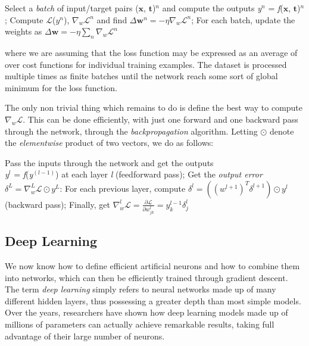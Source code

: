 \begin{outline}[enumerate]
    \1 Select a \emph{batch} of input/target pairs ($\mathbf{x}$, $\mathbf{t}$)$^n$ and compute the outputs \emph{y}$^n$ = \emph{f}($\mathbf{x}$, $\mathbf{t}$)$^n$;
    \1 Compute $\mathcal{L}$($y^n$), $\nabla_w \mathcal{L}^n$ and find $ \Delta \mathbf{w}^n = - \eta \nabla_w \mathcal{L}^n$;
    \1 For each batch, update the weights as $ \Delta \mathbf{w} = - \eta \sum_n \nabla_w \mathcal{L}^n$
\end{outline}

where we are assuming that the loss function may be expressed as an average of over cost functions for individual training examples. The dataset is processed multiple times as finite batches until the network reach some sort of global minimum for the loss function.

The only non trivial thing which remains to do is define the best way to compute $\nabla_w \mathcal{L}$. This can be done efficiently, with just one forward and one backward pass through the network, through the \emph{backpropagation} algorithm. Letting $\odot$ denote the \emph{elementwise} product of two vectors, we do as follows:

\begin{outline}[enumerate]
    \1 Pass the inputs through the network and get the outputs\\
    \emph{y}$^l$ = \emph{f}(\emph{y}$^{(l-1)}$) at each layer \emph{l} (feedforward pass);
    \1 Get the \emph{output error} $\delta^L = \nabla_w^L \mathcal{L} \odot y^L$:
    \1 For each previous layer, compute $\delta^l = ((w^{l+1})^T\delta^{l+1})\odot y^l$ (backward pass);
    \1 Finally, get $\nabla_w^l \mathcal{L} = \frac{\partial \mathcal{L}}{\partial w^l_{jk}} = y^{l-1}_k\delta^l_j$
\end{outline}


\subsection{Deep Learning}
We now know how to define efficient artificial neurons and how to combine them into networks, which can then be efficiently trained through gradient descent. 
The term \emph{deep learning} simply refers to neural networks made up of many different hidden layers, thus possessing a greater depth than most simple models. Over the years, researchers have shown how deep learning models made up of millions of parameters can actually achieve remarkable results, taking full advantage of their large number of neurons.

